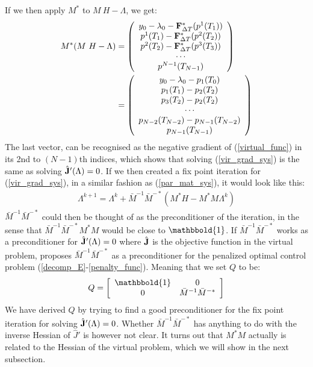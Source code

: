 \documentclass[11pt,a4paper]{article}
\begin{document}
If we then apply $M^*$ to $M \ H-\Lambda$, we get:
\begin{align}
M^* (M \ H-\Lambda)&=
	\left( \begin{array}{c}
	y_0-\lambda_0 -\bold{F}_{\Delta T}^*(p^1(T_1))\\
	 p^1(T_1)-\bold{F}_{\Delta T}^*(p^2( T_2))\\
	p^2( T_2)-\bold{F}_{\Delta T}^*(p^3( T_3))\\
	\cdots \\
	p^{N-1}(T_{N-1})
	\end{array} \right)
	\\
	&=\left( \begin{array}{c}
	y_0-\lambda_0 - p_1(T_0)\\
	p_1(T_1)-p_2(T_2)\\
	p_3(T_2)-p_2(T_2)\\
	\cdots \\
	p_{N-2}(T_{N-2})-p_{N-1}(T_{N-2}) \\
	p_{N-1}(T_{N-1})
	\end{array} \right)
\end{align}
The last vector, can be recognised as the negative gradient of (\ref{virtual_func}) in its 2nd to $(N-1)$th indices, which shows that solving (\ref{vir_grad_sys}) is the same as solving $\hat {\bold J}'(\Lambda)=0$. If we then created a fix point iteration for (\ref{vir_grad_sys}), in a similar fashion as (\ref{par_mat_sys}), it would look like this:
\begin{align*}
\Lambda^{k+1} = \Lambda^k + \bar{M}^{-1}\bar M^{-*}(M^*H-M^*M\Lambda^k)
\end{align*}
$\bar{M}^{-1}\bar{M}^{-*}$ could then be thought of as the preconditioner of the iteration, in the sense that $\bar{M}^{-1}\bar{M}^{-*}M^*M$ would be close to $\mathbbold{1}$. If $\bar{M}^{-1}\bar{M}^{-*}$ works as a preconditioner for  $\hat {\bold J}'(\Lambda)=0$ where $\hat {\bold J}$ is the objective function in the virtual problem, \cite{maday2002parareal} proposes $\bar{M}^{-1}\bar{M}^{-*}$ as a preconditioner for the penalized optimal control problem (\ref{decomp_E}-\ref{penalty_func}). Meaning that we set $Q$ to be:
\begin{align}
Q = \left[ \begin{array}{cc}
	\mathbbold{1} & 0 \\
	0 &  \bar{M}^{-1}\bar{M}^{-*}\\
	\end{array} \right] \label{Q_PC}
\end{align}  
We have derived $Q$ by trying to find a good preconditioner for the fix point iteration for solving $\hat {\bold J}'(\Lambda)=0$. Whether $\bar{M}^{-1}\bar{M}^{-*}$ has anything to do with the inverse Hessian of $\hat J'$ is however not clear. It turns out that $M^*M$ actually is related to the Hessian of the virtual problem, which we will show in the next subsection.
\end{document}
